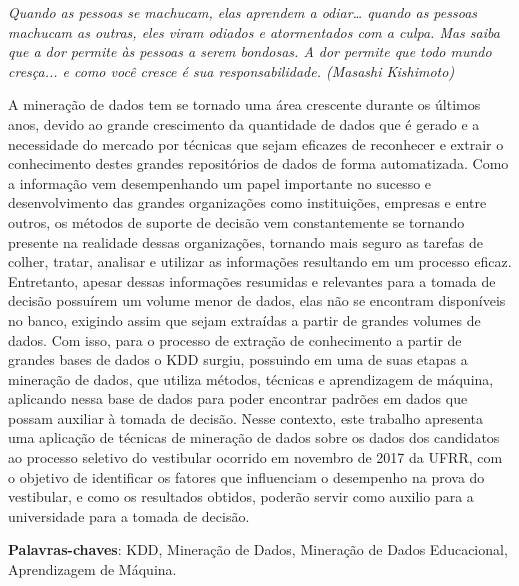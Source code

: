 \documentclass[
	12pt,				%
    oneside,			%
	a4paper,			%
	chapter=TITLE,		%
	english,			%
	brazil				%
	]{abntex2}
\begin{document}
\begin{epigrafe}
    \vspace*{\fill}
	\begin{flushright}
		\textit{Quando as pessoas se machucam, elas aprendem a odiar… quando as pessoas machucam as outras, eles viram odiados e atormentados com a culpa. Mas saiba que a dor permite às pessoas a serem bondosas. A dor permite que todo mundo cresça... e como você cresce é sua responsabilidade. (Masashi Kishimoto)}
	\end{flushright}
\end{epigrafe}


\setlength{\absparsep}{18pt} %
\begin{resumo}
    A mineração de dados tem se tornado uma área crescente durante os últimos anos, devido ao grande crescimento da quantidade de dados que é gerado e a necessidade do mercado por técnicas que sejam eficazes de reconhecer e extrair o conhecimento destes grandes repositórios de dados de forma automatizada. Como a informação vem desempenhando um papel importante no sucesso e desenvolvimento das grandes organizações como instituições, empresas e entre outros, os métodos de suporte de decisão vem constantemente se tornando presente na realidade dessas organizações, tornando mais seguro as tarefas de colher, tratar, analisar e utilizar as informações resultando em um processo eficaz. Entretanto, apesar dessas informações resumidas e relevantes para a tomada de decisão possuírem um volume menor de dados, elas não se encontram disponíveis no banco, exigindo assim que sejam extraídas a partir de grandes volumes de dados. Com isso, para o processo de extração de conhecimento a partir de grandes bases de dados o KDD surgiu, possuindo em uma de suas etapas a mineração de dados, que utiliza métodos, técnicas e aprendizagem de máquina, aplicando nessa base de dados para poder encontrar padrões em dados que possam auxiliar à tomada de decisão. Nesse contexto, este trabalho apresenta uma aplicação de técnicas de mineração de dados sobre os dados dos candidatos ao processo seletivo do vestibular ocorrido em novembro de 2017 da UFRR, com o objetivo de identificar os fatores que influenciam o desempenho na prova do vestibular, e como os resultados obtidos, poderão servir como auxilio para a universidade para a tomada de decisão. %

 \vspace{\onelineskip}
 
 \noindent 
 \textbf{Palavras-chaves}: KDD, Mineração de Dados, Mineração de Dados Educacional, Aprendizagem de Máquina.
\end{resumo}
\end{document}
